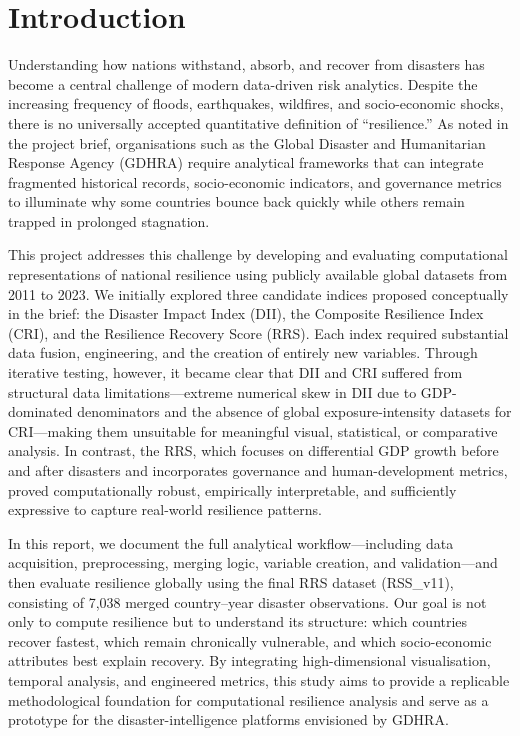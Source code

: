 \documentclass[conference]{IEEEtran}
\begin{document}
\section*{Introduction}
\noindent
Understanding how nations withstand, absorb, and recover from disasters has become a central challenge of modern data-driven risk analytics. Despite the increasing frequency of floods, earthquakes, wildfires, and socio-economic shocks, there is no universally accepted quantitative definition of “resilience.” As noted in the project brief, organisations such as the Global Disaster and Humanitarian Response Agency (GDHRA) require analytical frameworks that can integrate fragmented historical records, socio-economic indicators, and governance metrics to illuminate why some countries bounce back quickly while others remain trapped in prolonged stagnation.

This project addresses this challenge by developing and evaluating computational representations of national resilience using publicly available global datasets from 2011 to 2023. We initially explored three candidate indices proposed conceptually in the brief: the Disaster Impact Index (DII), the Composite Resilience Index (CRI), and the Resilience Recovery Score (RRS). Each index required substantial data fusion, engineering, and the creation of entirely new variables. Through iterative testing, however, it became clear that DII and CRI suffered from structural data limitations—extreme numerical skew in DII due to GDP-dominated denominators and the absence of global exposure-intensity datasets for CRI—making them unsuitable for meaningful visual, statistical, or comparative analysis. In contrast, the RRS, which focuses on differential GDP growth before and after disasters and incorporates governance and human-development metrics, proved computationally robust, empirically interpretable, and sufficiently expressive to capture real-world resilience patterns.

In this report, we document the full analytical workflow—including data acquisition, preprocessing, merging logic, variable creation, and validation—and then evaluate resilience globally using the final RRS dataset (RSS\_v11), consisting of 7,038 merged country–year disaster observations. Our goal is not only to compute resilience but to understand its structure: which countries recover fastest, which remain chronically vulnerable, and which socio-economic attributes best explain recovery. By integrating high-dimensional visualisation, temporal analysis, and engineered metrics, this study aims to provide a replicable methodological foundation for computational resilience analysis and serve as a prototype for the disaster-intelligence platforms envisioned by GDHRA.
\end{document}
